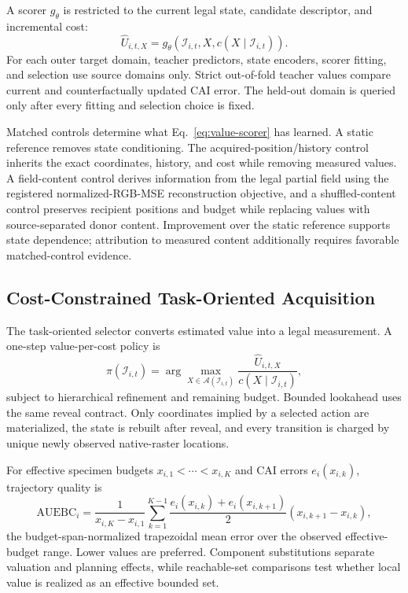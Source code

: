\documentclass[preprint,12pt]{elsarticle}
\newcommand{\auebc}{\mathrm{AUEBC}}
\newcommand{\legal}{\mathcal{I}}
\newcommand{\actions}{\mathcal{A}}
\begin{document}
A scorer $g_\theta$ is restricted to the current legal state, candidate
descriptor, and incremental cost:
\begin{equation}
  \widehat U_{i,t,X}=g_\theta\!\left(
  \legal_{i,t},X,c(X\mid\legal_{i,t})\right).
  \label{eq:value-scorer}
\end{equation}
For each outer target domain, teacher predictors, state encoders, scorer
fitting, and selection use source domains only. Strict out-of-fold teacher
values compare current and counterfactually updated CAI error. The held-out
domain is queried only after every fitting and selection choice is fixed.

Matched controls determine what Eq.~\eqref{eq:value-scorer} has learned. A
static reference removes state conditioning. The acquired-position/history control
inherits the exact coordinates, history, and cost while removing measured
values. A field-content control derives information from the legal
partial field using the registered normalized-RGB-MSE reconstruction objective,
and a shuffled-content control preserves recipient positions and budget while
replacing values with source-separated donor content.
Improvement over the static reference supports state dependence; attribution
to measured content additionally requires favorable matched-control evidence.

\subsection{Cost-Constrained Task-Oriented Acquisition}
\label{sec:framework-acquisition}

The task-oriented selector converts estimated value into a legal measurement.
A one-step value-per-cost policy is
\begin{equation}
  \pi(\legal_{i,t})=\arg\max_{X\in\actions(\legal_{i,t})}
  \frac{\widehat U_{i,t,X}}{c(X\mid\legal_{i,t})},
  \label{eq:policy}
\end{equation}
subject to hierarchical refinement and remaining budget. Bounded lookahead
uses the same reveal contract. Only coordinates implied by a selected action
are materialized, the state is rebuilt after reveal, and every transition is
charged by unique newly observed native-raster locations.

For effective specimen budgets $x_{i,1}<\cdots<x_{i,K}$ and CAI errors
$e_i(x_{i,k})$, trajectory quality is
\begin{equation}
  \auebc_i=\frac{1}{x_{i,K}-x_{i,1}}
  \sum_{k=1}^{K-1}
  \frac{e_i(x_{i,k})+e_i(x_{i,k+1})}{2}
  (x_{i,k+1}-x_{i,k}),
  \label{eq:auebc}
\end{equation}
the budget-span-normalized trapezoidal mean error over the observed
effective-budget range. Lower values are preferred. Component substitutions
separate valuation and planning effects, while reachable-set comparisons test
whether local value is realized as an effective bounded set.
\end{document}
